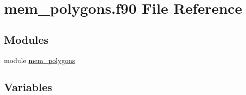 \hypertarget{mem__polygons_8f90}{}\section{mem\+\_\+polygons.\+f90 File Reference}
\label{mem__polygons_8f90}
\subsection*{Modules}
\begin{DoxyCompactItemize}
\item 
module \hyperlink{namespacemem__polygons}{mem\+\_\+polygons}
\end{DoxyCompactItemize}
\subsection*{Variables}
